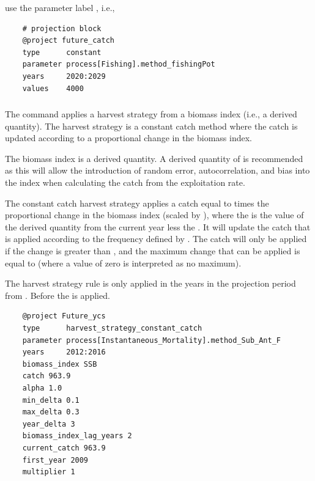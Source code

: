 use the parameter label	, i.e., 

{\small{\begin{verbatim}
	# projection block
	@project future_catch
	type      constant
	parameter process[Fishing].method_fishingPot
	years     2020:2029
	values    4000
\end{verbatim}}}

\subsubsection{}
\label{sec:Project-HarvestStrategyConstantCatch} 

The  command applies a harvest strategy from a biomass index (i.e., a derived quantity). The harvest strategy is a constant catch method where the catch is updated according to a proportional change in the biomass index. 

The biomass index is a derived quantity. A derived quantity of  is recommended as this will allow the introduction of random error, autocorrelation, and bias into the index when calculating the catch from the exploitation rate.

The constant catch harvest strategy applies a catch equal to  times the proportional change in the biomass index (scaled by ), where the  is the value of the derived quantity from the current year less the . It will update the catch that is applied according to the frequency defined by . The catch will only be applied if the change is greater than , and the maximum change that can be applied is equal to  (where a value of zero is interpreted as no maximum). 

The harvest strategy rule is only applied in the years in the projection period from . Before  the  is applied.

{\small{\begin{verbatim}
	@project Future_ycs
	type      harvest_strategy_constant_catch
	parameter process[Instantaneous_Mortality].method_Sub_Ant_F
	years     2012:2016
	biomass_index SSB
	catch 963.9
	alpha 1.0
	min_delta 0.1
	max_delta 0.3
	year_delta 3
	biomass_index_lag_years 2
	current_catch 963.9
	first_year 2009
	multiplier 1
\end{verbatim}}}

